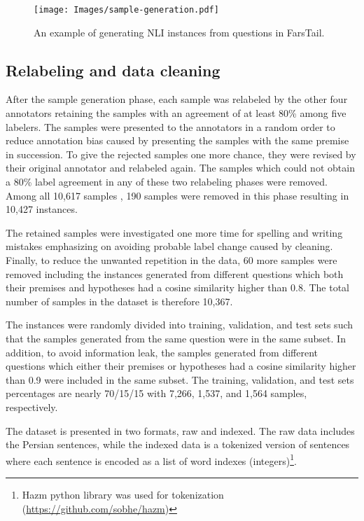 \documentclass[preprint,12pt]{elsarticle}
\begin{document}
\begin{figure}[t!]
    \centering
    \texttt{[image: Images/sample-generation.pdf]}
    \caption{An example of generating NLI instances from questions in FarsTail.}
    \label{fig:generation}
\end{figure}

\subsection{Relabeling and data cleaning}
\label{subsec:relabel}
After the sample generation phase, each sample was relabeled by the other four annotators retaining the samples with an agreement of at least 80\% among five labelers. The samples were presented to the annotators in a random order to reduce annotation bias caused by presenting the samples with the same premise in succession. To give the rejected samples one more chance, they were revised by their original annotator and relabeled again. The samples which could not obtain a 80\% label agreement in any of these two relabeling phases were removed. Among all 10,617 samples , 190 samples were removed in this phase resulting in 10,427 instances.

The retained samples were investigated one more time for spelling and writing mistakes emphasizing on avoiding probable label change caused by cleaning. Finally, to reduce the unwanted repetition in the data, 60 more samples were removed including the instances generated from different questions which both their premises and hypotheses had a cosine similarity higher than 0.8. The total number of samples in the dataset is therefore 10,367. 

The instances were randomly divided into training, validation, and test sets such that the samples generated from the same question were in the same subset. In addition, to avoid information leak, the samples generated from different questions which either their premises or hypotheses had a cosine similarity higher than 0.9 were included in the same subset. The training, validation, and test sets percentages are nearly 70/15/15 with 7,266, 1,537, and 1,564 samples, respectively.

The dataset is presented in two formats, raw and indexed. The raw data includes the Persian sentences, while the indexed data is a tokenized version of sentences where each sentence is encoded as a list of word indexes (integers)\footnote{Hazm python library was used for tokenization (\url{https://github.com/sobhe/hazm})}. 
\end{document}
